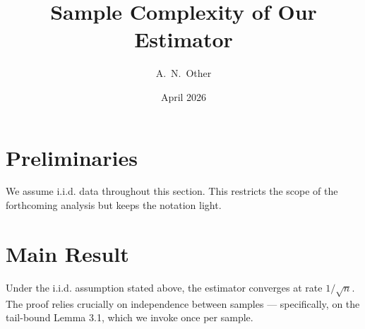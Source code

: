 \documentclass[11pt]{article}
\title{Sample Complexity of Our Estimator}
\author{A.\ N.\ Other}
\date{April 2026}
\begin{document}
\maketitle

\section{Preliminaries}

We assume i.i.d. data throughout this section. This restricts the scope of the forthcoming analysis but keeps the notation light.

\section{Main Result}

Under the i.i.d. assumption stated above, the estimator converges at rate $1/\sqrt{n}$.
The proof relies crucially on independence between samples --- specifically, on the tail-bound Lemma 3.1, which we invoke once per sample.
\end{document}
